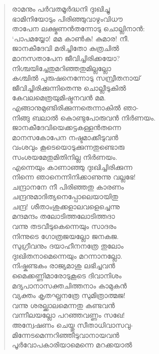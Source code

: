 \begin{verse}
രാമനും പര്‍വതമൂര്‍ദ്ധനി ദുഃഖിച്ചു\\
ഭാമിനിയോടും പിരിഞ്ഞുവാഴുംവിധൗ\\
താപേന ലക്ഷ്മണന്‍തന്നോടു ചൊല്ലിനാന്‍:\\
‘പാപമയ്യോ! മമ കാണ്‍ക! കുമാര! നീ.\\
ജാനകീദേവി മരിച്ചിതോ കുത്രചില്‍\\
മാനസതാപേന ജീവിച്ചിരിക്കയോ?\\
നിശ്ചയിച്ചേതുമറിഞ്ഞതുമില്ലല്ലോ\\
കശ്ചില്‍ പുരുഷനെന്നോടു സമ്പ്രീതനായ്\\
ജീവിച്ചിരിക്കുന്നിതെന്നു ചൊല്ലീടുകില്‍\\
കേവലമെത്രയുമിഷ്ടനവന്‍ മമ.\\
എങ്ങാനുമുണ്ടിരിക്കുന്നതെന്നാകില്‍ ഞാ-\\
നിങ്ങു ബലാല്‍ കൊണ്ടുപോരുവന്‍ നിര്‍ണയം.\\
ജാനകീദേവിയെക്കട്ടകള്ളന്‍തന്നെ\\
മാനസകോപേന നഷ്ടമാക്കീടുവന്‍\\
വംശവും കൂടെയൊടുക്കുന്നതുണ്ടൊരു\\
സംശയമേതുമിതിനില്ല നിര്‍ണയം.\\
എന്നെയും കാണാഞ്ഞു ദുഃഖിച്ചിരിക്കുന്ന\\
നിന്നെ ഞാനെന്നിനിക്കാണുന്നു വല്ലഭേ!\\
ചന്ദ്രാനനേ നീ പിരിഞ്ഞതു കാരണം\\
ചന്ദ്രനുമാദിത്യനെപ്പോലെയായിതു\\
ചന്ദ്ര! ശീതാംശുക്കളാലവളെച്ചെന്നു\\
മന്ദമന്ദം തലോടിത്തലോടിത്തദാ\\
വന്നു തടവീടുകെന്നെയും സാദരം\\
നിന്നുടെ ഗോത്രജയല്ലോ ജനകജ.\\
സുഗ്രീവനും ദയാഹീനനത്രേ തുലോം\\
ദുഃഖിതനാമെന്നെയും മറന്നാനല്ലോ.\\
നിഷ്കണ്ടകം രാജ്യമാശു ലഭിച്ചവന്‍\\
മൈക്കണ്ണിമാരോടുകൂടെ ദിവാനിശം\\
മദ്യപാനാസക്തചിത്തനാം കാമുകന്‍\\
വ്യക്തം കൃതഘ്നനത്രേ സുമിത്രാത്മജ!\\
വന്നു ശരല്ക്കാലമെന്നതു കണ്ടവന്‍\\
വന്നീലയല്ലോ പറഞ്ഞവണ്ണം സഖേ!\\
അന്വേഷണം ചെയ്തു സീതാധിവാസവു-\\
മിന്നേടമെന്നറിഞ്ഞീടുവാനായവന്‍\\
പൂര്‍വോപകാരിയാമെന്നെ മറക്കയാല്‍\\

\end{verse}
